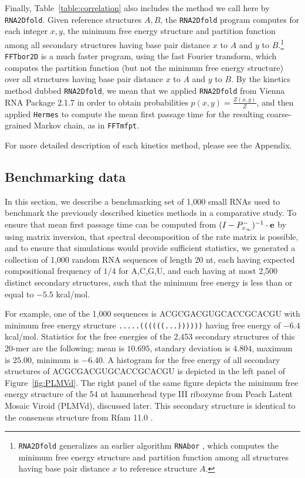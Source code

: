 Finally, Table~\ref{table:correlation}
also includes the method we call here by {\tt RNA2Dfold}.
Given reference structures $A,B$, the {\tt RNA2Dfold}  program
\cite{hofacker:RNAbor2D,Lorenz.amb11} computes for each integer
$x,y$, the minimum free energy structure and partition function
among all secondary structures having base pair distance $x$ to $A$
and $y$ to $B$.\footnote{{\tt RNA2Dfold} generalizes an earlier algorithm
{\tt RNAbor} \cite{Freyhult.b07,Freyhult.nar07}, which computes the
minimum free energy structure and partition function among all structures
having base pair distance $x$ to reference structure $A$.}
{\tt FFTbor2D} \cite{Senter.jmb14} is a much faster program, using the
fast Fourier transform, which
computes the partition function (but not the minimum free energy
structure) over all structures having base pair distance $x$ to $A$ and
$y$ to $B$. By the kinetics method dubbed
{\tt RNA2Dfold}, we mean that we applied
{\tt RNA2Dfold} from Vienna RNA Package 2.1.7
\cite{hofacker:RNAbor2D,Lorenz.amb11} in order
to obtain probabilities $p(x,y) = \frac{Z(x,y)}{Z}$,
and then applied {\tt Hermes} to compute the mean first passage time for
the resulting coarse-grained Markov chain, as in {\tt FFTmfpt}.

For more detailed description of each kinetics method, please see
the Appendix.

\subsection{Benchmarking data}

In this section, we describe a
benchmarking set of 1,000 small RNAs used to benchmark the previously
described kinetics methods in a comparative study. To ensure that mean
first passage time can be computed from
$(I - P^{-}_{x_{\infty}})^{-1} \cdot {\bf e}$ by using matrix
inversion, that spectral decomposition of the rate matrix is possible,
and to ensure that \kinfold simulations would provide sufficient
statistics, we generated a collection of 1,000 random RNA sequences of
length 20 nt, each having expected compositional frequency of $1/4$
for A,C,G,U, and each having at most 2,500 distinct secondary
structures, such that the minimum free energy is less than or equal to
$-5.5$ kcal/mol.

For example, one of the 1,000 sequences is ACGCGACGUGCACCGCACGU with
minimum free energy structure {\tt .....((((((...))))))} having free
energy of $-6.4$ kcal/mol. Statistics for the free energies of the
2,453 secondary structures of this 20-mer are the following: mean is
$10.695$, standary deviation is $4.804$, maximum is $25.00$, minimum
is $-6.40$. A histogram for the free energy of all secondary
structures of ACGCGACGUGCACCGCACGU is depicted in
the left panel of Figure~\ref{fig:PLMVd}. The right panel of the
same figure depicts the minimum free energy structure of the
54 nt hammerhead type III ribozyme from Peach Latent Mosaic Viroid
(PLMVd), discussed later. This secondary structure is identical
to the consensus structure from Rfam 11.0 \cite{Gardner.nar11}.


